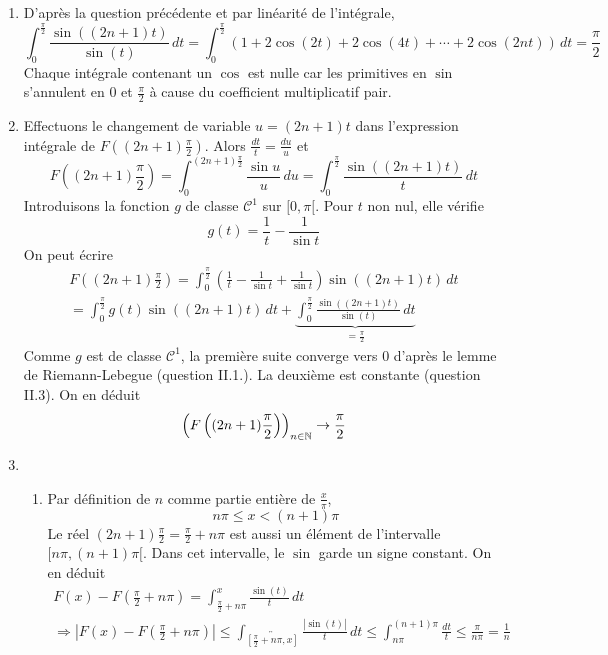 \begin{enumerate}
\begin{enumerate}
\end{enumerate}

  \item D'après la question précédente et par linéarité de l'intégrale,
\begin{displaymath}
\int_0^{\frac{\pi}{2}}\frac{\sin((2n+1)t)}{\sin(t)}\, dt
= \int_0^{\frac{\pi}{2}}\left(1+2\cos(2t)+2\cos(4t)+\cdots+2\cos(2nt) \right)\,dt 
= \frac{\pi}{2}
\end{displaymath}
Chaque intégrale contenant un $\cos$ est nulle car les primitives en $\sin$ s'annulent en $0$ et $\frac{\pi}{2}$ à cause du coefficient multiplicatif pair.

  \item Effectuons le changement de variable $u=(2n+1)t$ dans l'expression intégrale de $F((2n+1)\frac{\pi}{2})$. Alors $\frac{dt}{t} = \frac{du}{u}$ et
\begin{displaymath}
F((2n+1)\frac{\pi}{2})
=\int_0^{(2n+1)\frac{\pi}{2}}\frac{\sin u}{u} \, du
=\int_0^{\frac{\pi}{2}}\frac{\sin((2n+1)t)}{t}\, dt
\end{displaymath}
Introduisons la fonction $g$ de classe $\mathcal{C}^1$ sur $[0,\pi[$. Pour $t$ non nul, elle vérifie
\begin{displaymath}
  g(t) = \frac{1}{t} - \frac{1}{\sin t} 
\end{displaymath}
On peut écrire
\begin{multline*}
F((2n+1)\frac{\pi}{2}) = \int_0^{\frac{\pi}{2}}\left(\frac{1}{t}-\frac{1}{\sin t}+\frac{1}{\sin t}\right) \sin((2n+1)t)\, dt \\
= \int_0^{\frac{\pi}{2}}g(t)\sin((2n+1)t)\, dt 
+ \underset{=\frac{\pi}{2}}{\underbrace{\int_0^{\frac{\pi}{2}}\frac{\sin((2n+1)t)}{\sin(t)}\, dt}}
\end{multline*}
Comme $g$ est de classe $\mathcal{C}^1$, la première suite converge vers $0$ d'après le lemme de Riemann-Lebegue (question II.1.). La deuxième est constante (question II.3). On en déduit
\begin{displaymath}
  \left( F\left( (2n+1)\frac{\pi}{2}\right) \right)_{n\in \mathbb{N}} \rightarrow \frac{\pi}{2}
\end{displaymath}

  \item
\begin{enumerate}
\item Par définition de $n$ comme partie entière de $\frac{x}{\pi}$,
\begin{displaymath}
  n\pi \leq x < (n+1)\pi
\end{displaymath}
Le réel $(2n+1)\frac{\pi}{2}=\frac{\pi}{2} + n\pi$ est aussi un élément de l'intervalle $[n\pi, (n+1)\pi[$. Dans cet intervalle, le $\sin$ garde un signe constant. On en déduit
\begin{multline*}
  F(x) - F(\frac{\pi}{2} + n\pi) = 
\int_{\frac{\pi}{2} + n\pi}^x \frac{\sin(t)}{t}\,dt\\
\Rightarrow
\left|F(x) - F(\frac{\pi}{2} + n\pi) \right|
\leq
\int_{\overleftrightarrow{[\frac{\pi}{2} + n\pi,x]}}\frac{|\sin(t)|}{t}\, dt
\leq
\int_{n\pi}^{(n+1)\pi}\frac{dt}{t} \leq \frac{\pi}{n \pi} = \frac{1}{n}
\end{multline*}


\end{enumerate}
\end{enumerate}
